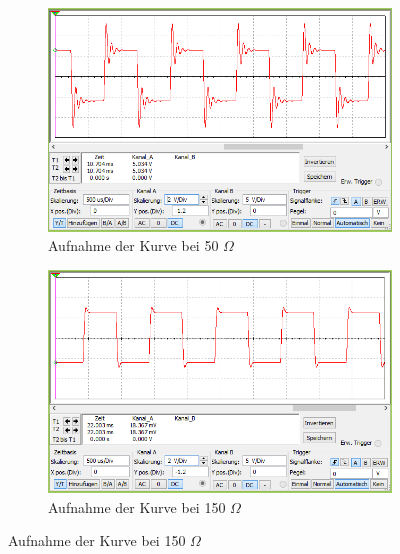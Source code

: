 \documentclass[12pt,a4paper]{article}
\begin{document}
\begin{figure}[H]
        \centering
        \begin{subfigure}[b]{0.28\textwidth}
                \includegraphics[width=\textwidth , scale = 0.4]{2_3_widerstand_50Ohm.PNG}
                \caption[Aufnahme der Kurve bei 50 $\Omega$]{Aufnahme der Kurve bei 50 $\Omega$}
                \label{fig:2_3_50}
        \end{subfigure}%
        \hfill
        \begin{subfigure}[b]{0.28\textwidth}
                \includegraphics[width=\textwidth , scale = 0.4]{2_3_widerstand_150Ohm.PNG}
                \caption[Aufnahme der Kurve bei 150 $\Omega$]{Aufnahme der Kurve bei 150 $\Omega$}
                \label{fig:23_150}
        \end{subfigure}

\end{figure}
\end{document}
